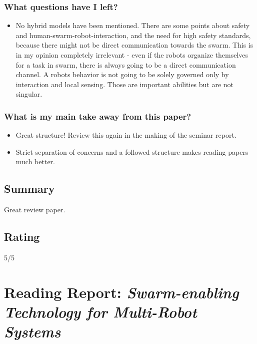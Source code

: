     \subsubsection*{What questions have I left?}
    \begin{itemize}
        \item No hybrid models have been mentioned. There are some points about safety and human-swarm-robot-interaction, and the need for high safety standards, because there might not be direct communication towards the swarm. This is in my opinion completely irrelevant - even if the robots organize themselves for a task in swarm, there is always going to be a direct communication channel. A robots behavior is not going to be solely governed only by interaction and local sensing. Those are important abilities but are not singular.    
    \end{itemize}
    \subsubsection*{What is my main take away from this paper?}
    \begin{itemize}
        \item Great structure! Review this again in the making of the seminar report. 
        \item Strict separation of concerns and a followed structure makes reading papers much better.
    \end{itemize}
    
    \subsection*{Summary}
    Great review paper.
    
    \subsection*{Rating}
    5/5
    \newpage
    
    \section{Reading Report: \emph{Swarm-enabling Technology for Multi-Robot Systems}}
    \cite{Chamanbaz2017}
    
